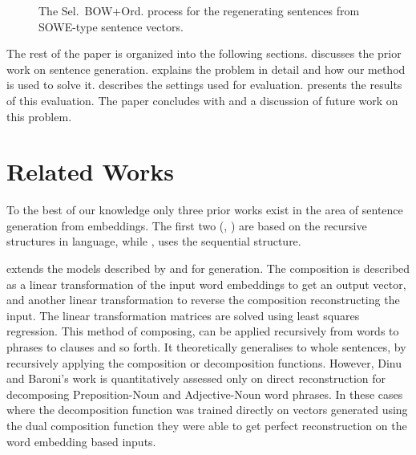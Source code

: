 \documentclass[compsoc]{IEEEtran}
\theoremstyle{plain}
\theoremstyle{definition}
\newcommand{\twosteptitle}{Sel.~BOW+Ord.}
\begin{document}
\begin{figure}
	\centering 
	
	\caption{The \twosteptitle{} process for the regenerating sentences from SOWE-type sentence vectors.}
	\label{block_diagram}
\end{figure}

The rest of the paper is organized into the following sections.  discusses the prior work on sentence  generation.  explains the problem in detail and how our method is used to solve it.  describes the settings used for evaluation.  presents the results of this evaluation. The paper concludes with  and a discussion of future work on this problem.


\section{Related Works}\label{relwork}


To the best of our knowledge only three prior works exist in the area of sentence generation from embeddings. The first two (\textcite{Dinu2014CompositionalGeneration}, \textcite{iyyer2014generating}) are based on the recursive structures in language, while \textcite{Bowman2015SmoothGeneration}, uses the sequential structure.


\renewcommand{\u}{\tilde{u}}

\textcite{Dinu2014CompositionalGeneration}  extends the models described by \textcite{zanzotto2010estimating} and \textcite{Guevara2010} for generation. The composition is described as a linear transformation of the input word embeddings to get an output vector, and another linear transformation to reverse the composition reconstructing the input. The linear transformation matrices are solved using least squares regression. This method of composing, can be applied recursively from words to phrases to clauses and so forth.
It theoretically generalises to whole sentences, by recursively applying the composition or decomposition functions. However, Dinu and Baroni's work is quantitatively assessed only on direct reconstruction for decomposing Preposition-Noun and Adjective-Noun word phrases. In these cases where the decomposition function was trained directly on vectors generated using the dual composition function they were able to get perfect reconstruction on the word embedding based inputs.
\end{document}
